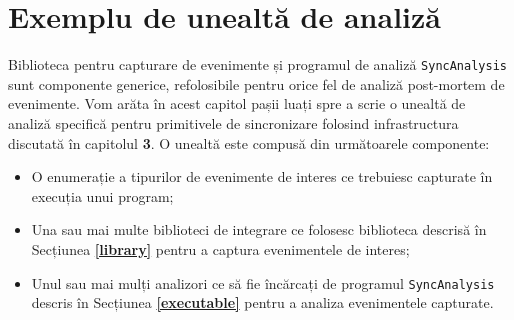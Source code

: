 \section{Exemplu de unealtă de analiză}

Biblioteca pentru capturare de evenimente și programul de analiză
\lstinline{SyncAnalysis} sunt componente generice, refolosibile
pentru orice fel de analiză post-mortem de evenimente. Vom arăta în
acest capitol pașii luați spre a scrie o unealtă de analiză specifică
pentru primitivele de sincronizare folosind infrastructura discutată în
capitolul \textbf{3}. O unealtă este compusă din următoarele componente:
\begin{itemize}
    \item O enumerație a tipurilor de evenimente de interes ce
    trebuiesc capturate în execuția unui program;
    \item Una sau mai multe biblioteci de integrare ce folosesc
    biblioteca descrisă în Secțiunea \textbf{\ref{library}} pentru a
    captura evenimentele de interes;
    \item Unul sau mai mulți analizori ce să fie încărcați de programul
    \lstinline{SyncAnalysis} descris în Secțiunea
    \textbf{\ref{executable}} pentru a analiza evenimentele capturate.
\end{itemize}






